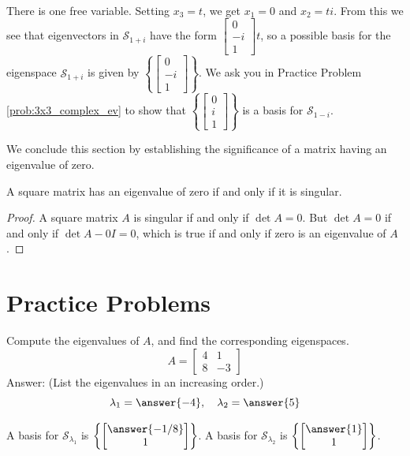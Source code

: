 \documentclass{ximera}
\begin{document}
\begin{example}
\begin{explanation}
\begin{align*}
\end{align*}
There is one free variable.  Setting $x_3=t$, we get $x_1=0$ and $x_2=ti$.  From this we see that eigenvectors in $\mathcal{S}_{1+i}$ have the form $\begin{bmatrix}0\\-i\\1\end{bmatrix}t$, so a possible basis for the eigenspace $\mathcal{S}_{1+i}$ is given by $\left\{\begin{bmatrix}0\\-i\\1\end{bmatrix}\right\}$.
We ask you in Practice Problem \ref{prob:3x3_complex_ev} to show that $\left\{\begin{bmatrix}0\\i\\1\end{bmatrix}\right\}$ is a basis for $\mathcal{S}_{1-i}$.
\end{explanation}
\end{example}

We conclude this section by establishing the significance of a matrix having an eigenvalue of zero.

\begin{theorem}\label{th:zero_ew}
A square matrix has an eigenvalue of zero if and only if it is singular.
\end{theorem}

\begin{proof}
A square matrix $A$ is singular if and only if $\det{A}=0$. But $\det{A}=0$ if and only if $\det{A-0I}=0$, which is true if and only if zero is an eigenvalue of $A$.
\end{proof}

\section*{Practice Problems}

\begin{problem}\label{prob:eigenspace3} Compute the eigenvalues of $A$, and find the corresponding eigenspaces.
$$A=\begin{bmatrix}4&1\\8&-3\end{bmatrix}$$
Answer:
(List the eigenvalues in an increasing order.)
$$\lambda_1=\answer{-4},\quad\lambda_2=\answer{5}$$

A basis for $\mathcal{S}_{\lambda_1}$ is $\left\{\begin{bmatrix}\answer{-1/8}\\1\end{bmatrix}\right\}$.  A basis for $\mathcal{S}_{\lambda_2}$ is $\left\{\begin{bmatrix}\answer{1}\\1\end{bmatrix}\right\}$.
\end{problem}
\end{document}
